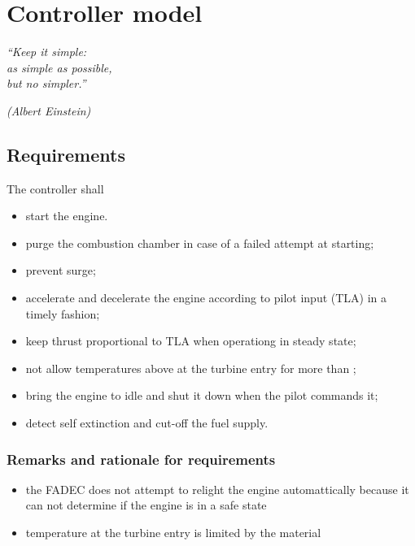 \documentclass[tcc]{subfiles}
\begin{document}
\chapter{Controller model}
\label{ch:control}
\epigraph{\em ``Keep it simple:\\
as simple as possible,\\
but no simpler.''}{\em (Albert Einstein)}

\section{Requirements}
The controller shall
\begin{itemize}
    \item start the engine.
    \item purge the combustion chamber in case of a failed attempt at starting;
    \item prevent surge;
    \item accelerate and decelerate the engine according to pilot input (\acs{TLA}) in a timely fashion;
    \item keep thrust proportional to \gls{TLA} when operationg in steady state;
    \item not allow temperatures above  at the turbine entry for more than ;
    \item bring the engine to idle and shut it down when the pilot commands it;
    \item detect self extinction and cut-off the fuel supply.
\end{itemize}

\subsection{Remarks and rationale for requirements}
\begin{itemize}
    \item the \gls{FADEC} does not attempt to relight the engine automattically 
          because it can not determine if the engine is in a safe state
    \item temperature at the turbine entry is limited by the material 
\end{itemize}
\end{document}

